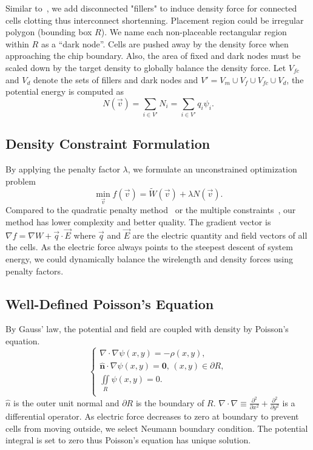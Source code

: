 \documentclass[conference,10pt]{IEEEtran}
\begin{document}
Similar to~\cite{filler,mpl6}, we add disconnected "fillers" to 
induce density force for connected cells clotting thus 
interconnect shortenning.
Placement region could be irregular polygon 
(bounding box $R$). 
We name each non-placeable rectangular region within $R$  
as a ``dark node''.
Cells are pushed away by the density force  
when approaching the chip boundary.
Also, the area of fixed and dark nodes
must be scaled down by the target density 
to globally balance the density force.
Let $V_{fc}$ and $V_d$ denote the sets of 
fillers and dark nodes and 
$V'=V_m\cup V_f\cup V_{fc}\cup V_{d}$, 
the potential energy is computed as
\begin{equation}
\label{eq:potn}
N(\vec{v})=\sum_{i\in V'}N_i=\sum_{i\in V'}q_i\psi_i.
\end{equation}



\subsection{Density Constraint Formulation}

By applying the penalty factor $\lambda$, 
we formulate an unconstrained optimization problem 
\begin{equation}
\label{eq:obj2}
\min_{\vec{v}} f(\vec{v})=\widetilde{W}(\vec{v})+\lambda N(\vec{v}).
\end{equation}
Compared to the quadratic penalty method~\cite{ntupl3,aplace2} or 
the multiple constraints~\cite{mpl6}, 
our method has lower complexity and better quality. 
The gradient vector is 
$\nabla f=\nabla W + \vec{q}\cdot\vec{E}$ where 
$\vec{q}$ and $\vec{E}$ are the electric quantity and 
field vectors of all the cells.
As the electric force always points to the steepest descent 
of system energy, 
we could dynamically balance the wirelength and density forces
using penalty factors.

\subsection{Well-Defined Poisson's Equation}

By Gauss' law, 
the potential and field 
are coupled with density by Poisson's equation.
\begin{equation}
\label{eq:poi}
\begin{cases}
\nabla\cdot\nabla\psi (x,y) = -\rho(x,y)\text{,} \\
\mathbf{\hat{n}}\cdot\nabla\psi (x,y) = \mathbf{0} \text{,     } (x,y)\in \partial R, \\
\iint\limits_R \psi(x,y) = 0\text{.} \\
\end{cases}
\end{equation}
$\hat{n}$ is the outer unit normal and 
$\partial R$ is the boundary of $R$. 
$\nabla\cdot\nabla\equiv\frac{\partial^2}{\partial x^2}+\frac{\partial^2}{\partial y^2}$ is a differential operator.
As electric force decreases to zero at boundary 
to prevent cells from moving outside, 
we select Neumann boundary condition. 
The potential integral is set to zero 
thus Poisson's equation has unique solution.
\end{document}
